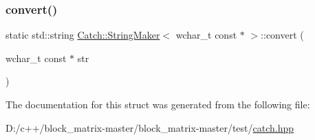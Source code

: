 \subsubsection{\texorpdfstring{convert()}{convert()}}
{\footnotesize\ttfamily static std\+::string \mbox{\hyperlink{struct_catch_1_1_string_maker}{Catch\+::\+String\+Maker}}$<$ wchar\+\_\+t const $\ast$ $>$\+::convert (\begin{DoxyParamCaption}\item[{wchar\+\_\+t const $\ast$}]{str }\end{DoxyParamCaption})\hspace{0.3cm}{\ttfamily [static]}}



The documentation for this struct was generated from the following file\+:\begin{DoxyCompactItemize}
\item 
D\+:/c++/block\+\_\+matrix-\/master/block\+\_\+matrix-\/master/test/\mbox{\hyperlink{catch_8hpp}{catch.\+hpp}}\end{DoxyCompactItemize}
